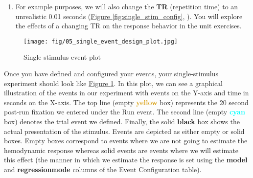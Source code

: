 \documentclass[10pt]{article}
\newcommand*\circled[1]{\tikz[baseline=(char.base)]{
            \node[shape=circle,draw,inner sep=.5pt] (char) {#1};}}
\begin{document}
\begin{enumerate}
			\begin{enumerate}
				\item For the run configuration, we can use all of the defaults, except for \textbf{post} which denotes a post-run event where the participant views a fixation cross for a defined period of time.
				For this example, enter a post-run fixation event of 20 seconds.
				\item For the trial configuration, we can use the default settings.
				\item For the stimulus configuration, we will use the defaults except that we need to define a hemodynamic response model with which to convolve the event. In the \textbf{model} column, we will select \textbf{dmBLOCK} with an amplitude of 1. We also need to select a \textbf{regression\textunderscore mode} of AM1. 
				AM stands for amplitude modulation, which means that the height of the hemodynamic response will be dictated by the value entered int the dmBLOCK model specification.
				More on different types of models will be discussed later.
			\end{enumerate}
			\item For example purposes, we will also change the \textbf{TR} (repetition time) to an unrealistic 0.01 seconds (\hyperref[fig:single_stim_config]{Figure \ref{fig:single_stim_config}}, \circled{3}).
			You will explore the effects of a changing TR on the response behavior in the unit exercises.
		\end{enumerate}
		\begin{figure}[ht]
			\centering
			\texttt{[image: fig/05\_single\_event\_design\_plot.jpg]}
			\caption{Single stimulus event plot}
			\label{fig:single_event_plot}
		\end{figure}
		Once you have defined and configured your events, your single-stimulus experiment should look like \hyperref[fig:single_event_plot]{Figure \ref{fig:single_event_plot}}.
		In this plot, we can see a graphical illustration of the events in our experiment with events on the Y-axis and time in seconds on the X-axis.
		The top line (empty \textcolor{Goldenrod}{\textbf{yellow}} box) represents the 20 second post-run fixation we entered under the Run event.
		The second line (empty \textcolor{cyan}{\textbf{cyan}} box) denotes the trial event we defined.
		Finally, the solid \textbf{black} box shows the actual presentation of the stimulus.
		Events are depicted as either empty or solid boxes.
		Empty boxes correspond to events where we are not going to estimate the hemodynamic response whereas solid events are events where we will estimate this effect (the manner in which we estimate the response is set using the \textbf{model} and \textbf{regression\textunderscore mode} columns of the Event Configuration table).
\end{document}
